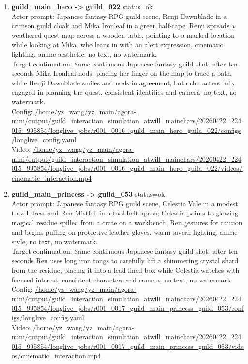\documentclass[11pt,a4paper]{article}
\begin{document}
\begin{enumerate}
\item \textbf{guild\_main\_hero -> guild\_022} status=ok\\\newline Actor prompt: Japanese fantasy RPG guild scene, Renji Dawnblade in a crimson guild cloak and Mika Ironleaf in a green half-cape; Renji spreads a weathered quest map across a wooden table, pointing to a marked location while looking at Mika, who leans in with an alert expression, cinematic lighting, anime aesthetic, no text, no watermark.\\\newline Target continuation: Same continuous Japanese fantasy guild shot; after ten seconds Mika Ironleaf nods, placing her finger on the map to trace a path, while Renji Dawnblade smiles and nods in agreement, both characters fully engaged in planning the quest, consistent identities and camera, no text, no watermark.\\\newline Config: \url{/home/yz\_wang/yz\_main/agora-mini/output/guild\_interaction\_simulation\_atwill\_mainchars/20260422\_224015\_995854/longlive\_jobs/r001\_0016\_guild\_main\_hero\_guild\_022/configs/longlive\_config.yaml}\\\newline Video: \url{/home/yz\_wang/yz\_main/agora-mini/output/guild\_interaction\_simulation\_atwill\_mainchars/20260422\_224015\_995854/longlive\_jobs/r001\_0016\_guild\_main\_hero\_guild\_022/videos/cinematic\_interaction.mp4}
\item \textbf{guild\_main\_princess -> guild\_053} status=ok\\\newline Actor prompt: Japanese fantasy RPG guild scene, Celestia Vale in a modest travel dress and Ren Mistfell in a tool-belt apron; Celestia points to glowing magical residue spilled from a crate on a workbench, Ren gestures for caution and begins pulling on protective leather gloves, warm tavern lighting, anime style, no text, no watermark.\\\newline Target continuation: Same continuous Japanese fantasy guild shot; after ten seconds Ren uses long iron tongs to carefully lift a shimmering crystal shard from the residue, placing it into a lead-lined box while Celestia watches with focused interest, consistent characters and camera, no text, no watermark.\\\newline Config: \url{/home/yz\_wang/yz\_main/agora-mini/output/guild\_interaction\_simulation\_atwill\_mainchars/20260422\_224015\_995854/longlive\_jobs/r001\_0017\_guild\_main\_princess\_guild\_053/configs/longlive\_config.yaml}\\\newline Video: \url{/home/yz\_wang/yz\_main/agora-mini/output/guild\_interaction\_simulation\_atwill\_mainchars/20260422\_224015\_995854/longlive\_jobs/r001\_0017\_guild\_main\_princess\_guild\_053/videos/cinematic\_interaction.mp4}

\end{enumerate}
\end{document}
